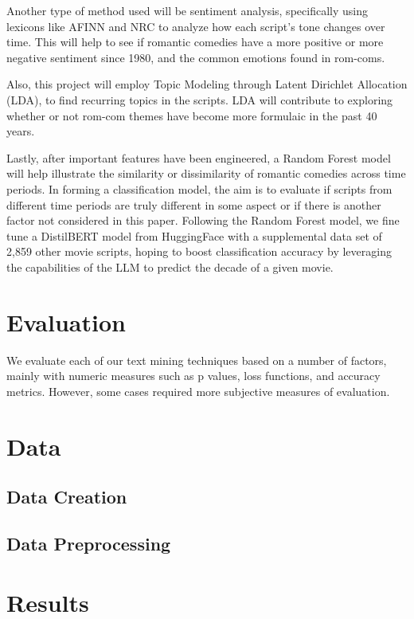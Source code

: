 \documentclass[
  authoryear,
  preprint]{elsarticle}
\begin{document}
Another type of method used will be sentiment analysis, specifically
using lexicons like AFINN and NRC to analyze how each script's tone
changes over time. This will help to see if romantic comedies have a
more positive or more negative sentiment since 1980, and the common
emotions found in rom-coms.

Also, this project will employ Topic Modeling through Latent Dirichlet
Allocation (LDA), to find recurring topics in the scripts. LDA will
contribute to exploring whether or not rom-com themes have become more
formulaic in the past 40 years.

Lastly, after important features have been engineered, a Random Forest
model will help illustrate the similarity or dissimilarity of romantic
comedies across time periods. In forming a classification model, the aim
is to evaluate if scripts from different time periods are truly
different in some aspect or if there is another factor not considered in
this paper. Following the Random Forest model, we fine tune a DistilBERT
model from HuggingFace with a supplemental data set of 2,859 other movie
scripts, hoping to boost classification accuracy by leveraging the
capabilities of the LLM to predict the decade of a given movie.

\section{Evaluation}\label{evaluation}

We evaluate each of our text mining techniques based on a number of
factors, mainly with numeric measures such as p values, loss functions,
and accuracy metrics. However, some cases required more subjective
measures of evaluation.

\section{Data}\label{data}

\subsection{Data Creation}\label{data-creation}

\subsection{Data Preprocessing}\label{data-preprocessing}

\section{Results}\label{results}
\end{document}
